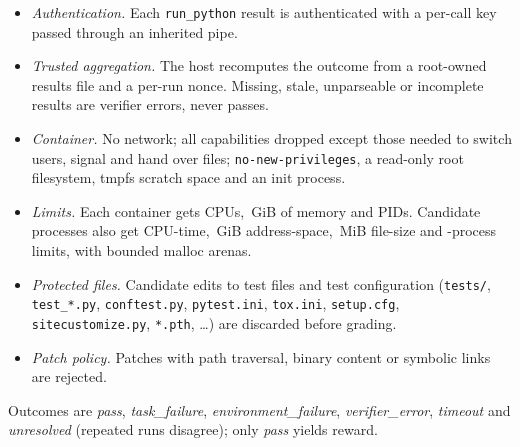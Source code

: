 \begin{itemize}
\item \emph{Authentication.} Each \texttt{run\_python} result is authenticated with a per-call key passed through an
  inherited pipe.
\item \emph{Trusted aggregation.} The host recomputes the outcome from a root-owned results file and a per-run nonce.
  Missing, stale, unparseable or incomplete results are verifier errors, never passes.
\item \emph{Container.} No network; all capabilities dropped except those needed to switch users, signal and hand over
  files; \texttt{no-new-privileges}, a read-only root filesystem, tmpfs scratch space and an init process.
\item \emph{Limits.} Each container gets  CPUs, \,GiB of memory and
   PIDs. Candidate processes also get CPU-time, \,GiB address-space,
  \,MiB file-size and -process limits, with bounded malloc arenas.
\item \emph{Protected files.} Candidate edits to test files and test configuration (\texttt{tests/},
  \texttt{test\_*.py}, \texttt{conftest.py}, \texttt{pytest.ini}, \texttt{tox.ini}, \texttt{setup.cfg},
  \texttt{sitecustomize.py}, \texttt{*.pth}, \dots) are discarded before grading.
\item \emph{Patch policy.} Patches with path traversal, binary content or symbolic links are rejected.
\end{itemize}
Outcomes are \emph{pass}, \emph{task\_failure}, \emph{environment\_failure}, \emph{verifier\_error}, \emph{timeout} and
\emph{unresolved} (repeated runs disagree); only \emph{pass} yields reward.

